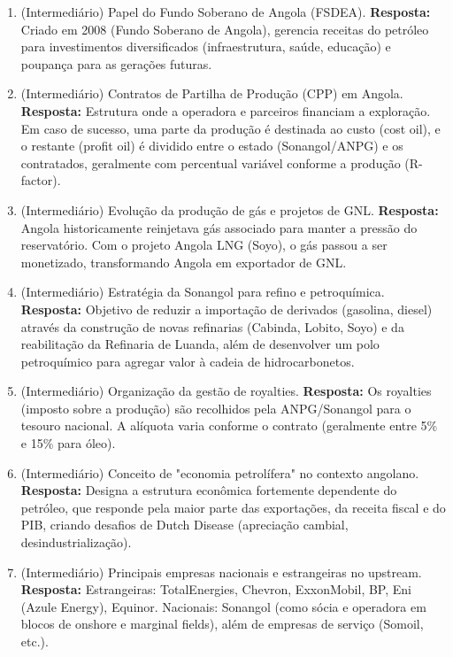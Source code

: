 \documentclass[11pt,a4paper]{article}
\begin{document}
\begin{enumerate}
  \item (Intermediário) Papel do Fundo Soberano de Angola (FSDEA).
  \textbf{Resposta:} Criado em 2008 (Fundo Soberano de Angola), gerencia receitas do petróleo para investimentos diversificados (infraestrutura, saúde, educação) e poupança para as gerações futuras.

  \item (Intermediário) Contratos de Partilha de Produção (CPP) em Angola.
  \textbf{Resposta:} Estrutura onde a operadora e parceiros financiam a exploração. Em caso de sucesso, uma parte da produção é destinada ao custo (cost oil), e o restante (profit oil) é dividido entre o estado (Sonangol/ANPG) e os contratados, geralmente com percentual variável conforme a produção (R-factor).

  \item (Intermediário) Evolução da produção de gás e projetos de GNL.
  \textbf{Resposta:} Angola historicamente reinjetava gás associado para manter a pressão do reservatório. Com o projeto Angola LNG (Soyo), o gás passou a ser monetizado, transformando Angola em exportador de GNL.

  \item (Intermediário) Estratégia da Sonangol para refino e petroquímica.
  \textbf{Resposta:} Objetivo de reduzir a importação de derivados (gasolina, diesel) através da construção de novas refinarias (Cabinda, Lobito, Soyo) e da reabilitação da Refinaria de Luanda, além de desenvolver um polo petroquímico para agregar valor à cadeia de hidrocarbonetos.

  \item (Intermediário) Organização da gestão de royalties.
  \textbf{Resposta:} Os royalties (imposto sobre a produção) são recolhidos pela ANPG/Sonangol para o tesouro nacional. A alíquota varia conforme o contrato (geralmente entre 5\% e 15\% para óleo).

  \item (Intermediário) Conceito de "economia petrolífera" no contexto angolano.
  \textbf{Resposta:} Designa a estrutura econômica fortemente dependente do petróleo, que responde pela maior parte das exportações, da receita fiscal e do PIB, criando desafios de Dutch Disease (apreciação cambial, desindustrialização).

  \item (Intermediário) Principais empresas nacionais e estrangeiras no upstream.
  \textbf{Resposta:} Estrangeiras: TotalEnergies, Chevron, ExxonMobil, BP, Eni (Azule Energy), Equinor. Nacionais: Sonangol (como sócia e operadora em blocos de onshore e marginal fields), além de empresas de serviço (Somoil, etc.).


\end{enumerate}
\end{document}
